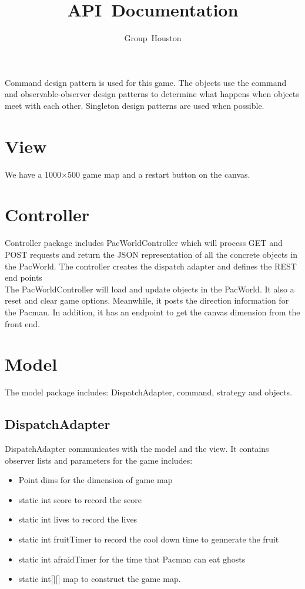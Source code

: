 \documentclass[letterpaper, 11pt]{article}
\author{Group~Houston}
\title{API~Documentation}
\date{}
\begin{document}
\maketitle
Command design pattern is used for this game. The objects use the command and observable-observer design patterns to determine what happens when objects meet with each other. Singleton design patterns are used when possible. 
\section{View}
We have a 1000$\times$500 game map and a restart button on the canvas.
\section{Controller}
Controller package includes PacWorldController which will process GET and POST requests and return the JSON representation of all the concrete objects in the PacWorld. The controller creates the dispatch adapter and defines the REST end points\\ 
 
The PacWorldController will load and update objects in the PacWorld. It also a reset and clear game options. Meanwhile, it posts the direction information for the Pacman. In addition, it has an endpoint to get the canvas dimension from the front end.
\section{Model}
The model  package includes: DispatchAdapter, command, strategy and objects.

\subsection{DispatchAdapter}
DispatchAdapter communicates with the model and the view. It contains observer lists and parameters for the game includes:
\begin{itemize}
\item Point dims for the dimension of game map
\item static int score to record the score
\item static int lives to record the lives
\item static int fruitTimer to record the cool down time to gennerate the fruit
\item static int afraidTimer for the time that Pacman can eat ghosts 
\item static int[][] map to construct the game map.
\end{itemize}
\end{document}

